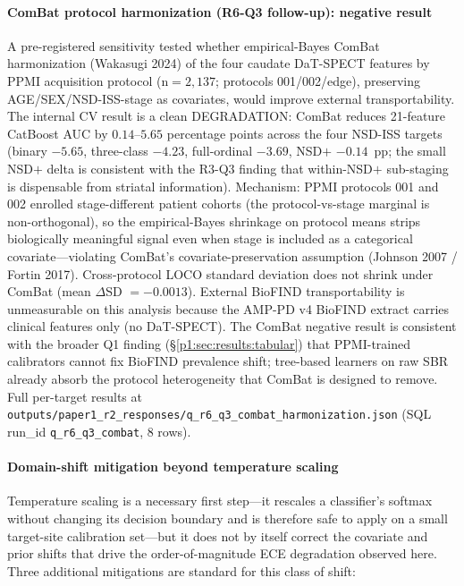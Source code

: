 \paragraph*{ComBat protocol harmonization (R6-Q3 follow-up): negative result} A pre-registered sensitivity tested whether empirical-Bayes ComBat harmonization (Wakasugi 2024) of the four caudate DaT-SPECT features by PPMI acquisition protocol (n${=}2{,}137$; protocols 001/002/edge), preserving AGE/SEX/NSD-ISS-stage as covariates, would improve external transportability. The internal CV result is a clean DEGRADATION: ComBat reduces 21-feature CatBoost AUC by $0.14$--$5.65$ percentage points across the four NSD-ISS targets (binary $-5.65$, three-class $-4.23$, full-ordinal $-3.69$, NSD$+$ $-0.14$~pp; the small NSD$+$ delta is consistent with the R3-Q3 finding that within-NSD$+$ sub-staging is dispensable from striatal information). Mechanism: PPMI protocols 001 and 002 enrolled stage-different patient cohorts (the protocol-vs-stage marginal is non-orthogonal), so the empirical-Bayes shrinkage on protocol means strips biologically meaningful signal even when stage is included as a categorical covariate---violating ComBat's covariate-preservation assumption (Johnson 2007 / Fortin 2017). Cross-protocol LOCO standard deviation does not shrink under ComBat (mean $\Delta$SD $=-0.0013$). External BioFIND transportability is unmeasurable on this analysis because the AMP-PD v4 BioFIND extract carries clinical features only (no DaT-SPECT). The ComBat negative result is consistent with the broader Q1 finding (\S\ref{p1:sec:results:tabular}) that PPMI-trained calibrators cannot fix BioFIND prevalence shift; tree-based learners on raw SBR already absorb the protocol heterogeneity that ComBat is designed to remove. Full per-target results at \texttt{outputs/paper1\_r2\_responses/q\_r6\_q3\_combat\_harmonization.json} (SQL run\_id \texttt{q\_r6\_q3\_combat}, 8 rows).

\paragraph*{Domain-shift mitigation beyond temperature scaling} Temperature scaling is a necessary first step---it rescales a classifier's softmax without changing its decision boundary and is therefore safe to apply on a small target-site calibration set---but it does not by itself correct the covariate and prior shifts that drive the order-of-magnitude ECE degradation observed here. Three additional mitigations are standard for this class of shift:

